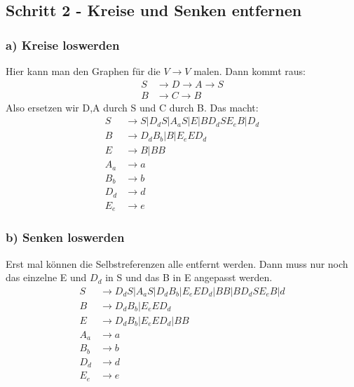\documentclass{article}
\begin{document}
\subsection*{Schritt 2 - Kreise und Senken entfernen}
\subsubsection*{a) Kreise loswerden}
Hier kann man den Graphen für die $V \rightarrow V$ malen. Dann kommt raus:
\begin{align*}
S&\rightarrow D\rightarrow A\rightarrow S\\
B&\rightarrow C\rightarrow B
\end{align*}
Also ersetzen wir D,A durch S und C durch B. Das macht:
\begin{align*}
S&\rightarrow S | D_dS | A_aS | E | BD_dSE_eB | D_d\\
B&\rightarrow D_dB_b | B | E_eED_d\\
E&\rightarrow B | BB\\
A_a&\rightarrow a\\
B_b&\rightarrow b\\
D_d&\rightarrow d\\
E_e&\rightarrow e
\end{align*}

\subsubsection*{b) Senken loswerden}
Erst mal können die Selbstreferenzen alle entfernt werden. Dann muss nur noch das einzelne E und $D_d$ in S und das B in E angepasst werden.
\begin{align*}
S&\rightarrow D_dS | A_aS | D_dB_b | E_eED_d | BB | BD_dSE_eB | d\\
B&\rightarrow D_dB_b | E_eED_d\\
E&\rightarrow D_dB_b | E_eED_d | BB\\
A_a&\rightarrow a\\
B_b&\rightarrow b\\
D_d&\rightarrow d\\
E_e&\rightarrow e
\end{align*}
\end{document}
